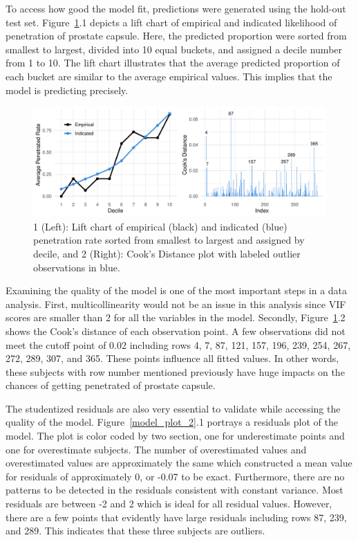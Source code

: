 \documentclass[11pt]{article}\usepackage[]{graphicx}\usepackage[]{color}
\makeatletter
\def\maxwidth{ %
  \ifdim\Gin@nat@width>\linewidth
    \linewidth
  \else
    \Gin@nat@width
  \fi
}
\makeatother
\begin{document}
\noindent To access how good the model fit, predictions were generated using the hold-out test set. Figure~\ref{model_plot_1}.1 depicts a lift chart of empirical and indicated likelihood of penetration of prostate capsule. Here, the predicted proportion were sorted from smallest to largest, divided into 10 equal buckets, and assigned a decile number from 1 to 10. The lift chart illustrates that the average predicted proportion of each bucket are similar to the average empirical values. This implies that the model is predicting precisely.  

\begin{figure}[h!] 
\begin{center}

\includegraphics[width=\maxwidth]{figure/unnamed-chunk-4-1} 

\caption{1 (Left): Lift chart of empirical (black) and indicated (blue) penetration rate sorted from smallest to largest and assigned by decile, and 2 (Right): Cook's Distance plot with labeled outlier observations in blue.}
\label{model_plot_1}
\end{center} 
\end{figure}

\noindent Examining the quality of the model is one of the most important steps in a data analysis. First, multicollinearity would not be an issue in this analysis since VIF scores are smaller than 2 for all the variables in the model. Secondly, Figure~\ref{model_plot_1}.2 shows the Cook's distance of each observation point. A few observations did not meet the cutoff point of 0.02 including rows 4, 7, 87, 121, 157, 196, 239, 254, 267, 272, 289, 307, and 365. These points influence all fitted values. In other words, these subjects with row number mentioned previously have huge impacts on the chances of getting penetrated of prostate capsule.    
\hfill \break

\noindent The studentized residuals are also very essential to validate while accessing the quality of the model. Figure~\ref{model_plot_2}.1 portrays a residuals plot of the model. The plot is color coded by two section, one for underestimate points and one for overestimate subjects. The number of overestimated values and overestimated values are approximately the same which constructed a mean value for residuals of approximately 0, or -0.07 to be exact. Furthermore, there are no patterns to be detected in the residuals consistent with constant variance. Most residuals are between -2 and 2 which is ideal for all residual values. However, there are a few points that evidently have large residuals including rows 87, 239, and 289. This indicates that these three subjects are outliers.        
\end{document}
